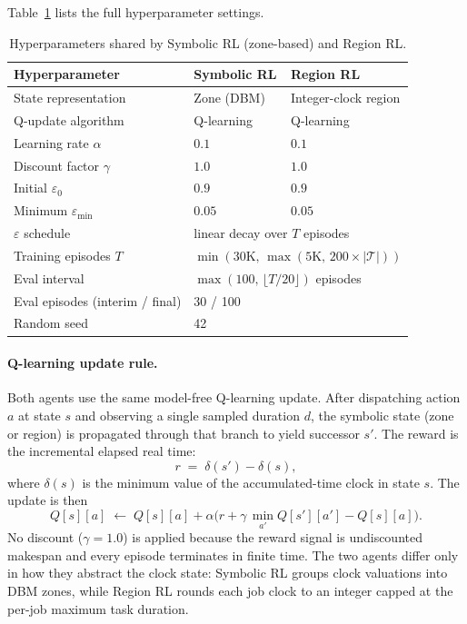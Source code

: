 Table~\ref{tab:hyperparams} lists the full hyperparameter settings.

\begin{table}[ht]
  \centering
  \caption{Hyperparameters shared by Symbolic RL (zone-based) and Region RL.}
  \label{tab:hyperparams}
  \small
  \begin{tabular}{lll}
    \toprule
    \textbf{Hyperparameter} & \textbf{Symbolic RL} & \textbf{Region RL} \\
    \midrule
    State representation & Zone (DBM) & Integer-clock region \\
    Q-update algorithm  & Q-learning & Q-learning \\
    Learning rate $\alpha$ & $0.1$ & $0.1$ \\
    Discount factor $\gamma$ & $1.0$ & $1.0$ \\
    Initial $\varepsilon_0$ & $0.9$ & $0.9$ \\
    Minimum $\varepsilon_{\min}$ & $0.05$ & $0.05$ \\
    $\varepsilon$ schedule & \multicolumn{2}{l}{linear decay over $T$ episodes} \\
    Training episodes $T$ & \multicolumn{2}{l}{$\min(30\text{K},\,\max(5\text{K},\,200{\times}|\mathcal{T}|))$} \\
    Eval interval & \multicolumn{2}{l}{$\max(100,\,\lfloor T/20\rfloor)$ episodes} \\
    Eval episodes (interim / final) & \multicolumn{2}{l}{30 / 100} \\
    Random seed & \multicolumn{2}{l}{42} \\
    \bottomrule
  \end{tabular}
\end{table}

\paragraph{Q-learning update rule.}
Both agents use the same model-free Q-learning update.  After dispatching
action $a$ at state $s$ and observing a single sampled duration $d$, the
symbolic state (zone or region) is propagated through that branch to yield
successor $s'$.  The reward is the incremental elapsed real time:
\[
  r \;=\; \delta(s') - \delta(s),
\]
where $\delta(s)$ is the minimum value of the accumulated-time clock in state
$s$.  The update is then
\[
  Q[s][a] \;\leftarrow\; Q[s][a]
    + \alpha\bigl(r + \gamma\,\min_{a'} Q[s'][a'] - Q[s][a]\bigr).
\]
No discount ($\gamma = 1.0$) is applied because the reward signal is
undiscounted makespan and every episode terminates in finite time.  The two
agents differ only in how they abstract the clock state: Symbolic RL groups
clock valuations into DBM zones, while Region RL rounds each job clock to an
integer capped at the per-job maximum task duration.

